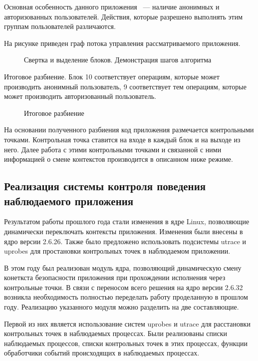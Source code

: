Основная особенность данного приложения ~--- наличие 
анонимных и авторизованных пользователей. Действия, 
которые разрешено выполнять этим группам пользователей
различаются. 

На рисунке приведен граф потока управления рассматриваемого 
приложения. 

\begin{figure}
  \scalebox{.35}{}
  \scalebox{.35}{}
\caption{Свертка и выделение блоков. Демонстрация шагов алгоритма}
\end{figure}


Итоговое разбиение. Блок 10 соответствует операциям, 
которые может производить анонимный пользователь, 
9 соответствует тем операциям, которые может производить 
авторизованный пользователь.

\begin{figure}
\centering
\scalebox{.80}{}
\caption{Итоговое разбиение} 
\end{figure}


На основании полученного разбиения код приложения размечается
контрольными точками. Контрольная точка ставится на входе 
в каждый блок и на выходе из него. Далее работа с этими 
контрольными точками и связанной с ними информацией о смене 
контекстов производится в описанном ниже режиме.

\subsection{Реализация системы контроля поведения
		наблюдаемого приложения}
\bigskip

Результатом работы прошлого года стали изменения в 
ядре Linux, позволяющие динамически переключать
контексты приложения. Изменения были внесены в ядро
версии 2.6.26. Также было предложено использовать 
подсистемы utrace и uprobes для простановки контрольных 
точек в наблюдаемом приложении. 

В этом году был реализован модуль ядра, позволяющий
динамическую смену конеткста безопасности приложения 
при прохождении исполнения через контрольные точки. 
В связи с переносом всего решения на ядро версии 
2.6.32 возникла необходимость полностью переделать 
работу проделанную в прошлом году. Реализацию 
указанного модуля можно разделить на две составляющие. 

Первой из них является использование систем uprobes и 
utrace для расстановки контрольных точек в наблюдаемых 
процессах. Были реализованы списки наблюдаемых процессов,
списки контрольных точек в этих процессах, функции обработчики 
событий происходящих в наблюдаемых процессах. 

